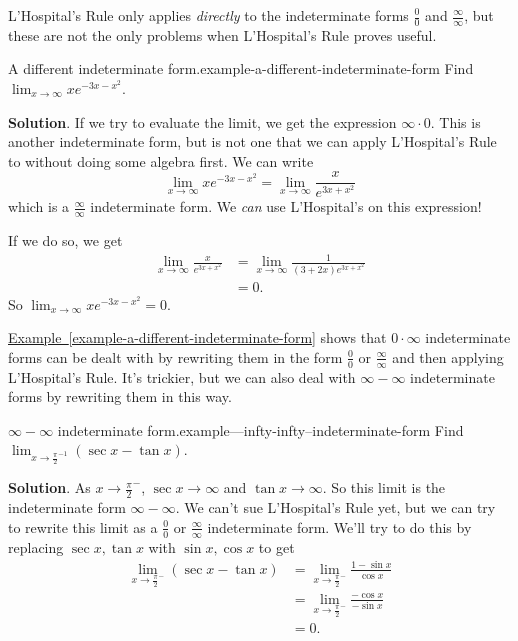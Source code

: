 \documentclass[10pt,]{book}
\numberwithin{equation}{section}
\begin{document}
\hypertarget{p-296}{}%
L'Hospital's Rule only applies \emph{directly} to the indeterminate forms \(\frac{0}{0}\) and \(\frac{\infty}{\infty}\), but these are not the only problems when L'Hospital's Rule proves useful.%
\begin{example}{A different indeterminate form.}{example-a-different-indeterminate-form}%
\hypertarget{p-297}{}%
Find \(\lim_{x\to\infty}xe^{-3x - x^{2}}\).%
\par\smallskip%
\noindent\textbf{Solution}.\hypertarget{solution-66}{}\quad%
\hypertarget{p-298}{}%
If we try to evaluate the limit, we get the expression \(\infty\cdot0\). This is another indeterminate form, but is not one that we can apply L'Hospital's Rule to without doing some algebra first. We can write%
\begin{equation*}
\lim_{x\to\infty}xe^{-3x-x^{2}} = \lim_{x\to\infty}\frac{x}{e^{3x+x^{2}}}
\end{equation*}
which is a \(\frac{\infty}{\infty}\) indeterminate form. We \emph{can} use L'Hospital's on this expression!%
\par
\hypertarget{p-299}{}%
If we do so, we get%
\begin{align*}
\lim_{x\to\infty}\frac{x}{e^{3x+x^{2}}} & = \lim_{x\to\infty}\frac{1}{(3+2x)e^{3x+x^{2}}} \\
& = 0. 
\end{align*}
So \(\lim_{x\to\infty}xe^{-3x-x^{2}} = 0\).%
\end{example}
\hypertarget{p-300}{}%
\hyperref[example-a-different-indeterminate-form]{Example~\ref{example-a-different-indeterminate-form}} shows that \(0\cdot\infty\) indeterminate forms can be dealt with by rewriting them in the form \(\frac{0}{0}\) or \(\frac{\infty}{\infty}\) and then applying L'Hospital's Rule. It's trickier, but we can also deal with \(\infty-\infty\) indeterminate forms by rewriting them in this way.%
\begin{example}{\(\infty-\infty\) indeterminate form.}{example---infty-infty--indeterminate-form}%
\hypertarget{p-301}{}%
Find \(\lim_{x\to\frac{\pi}{2}^{-1}}(\sec x-\tan x)\).%
\par\smallskip%
\noindent\textbf{Solution}.\hypertarget{solution-67}{}\quad%
\hypertarget{p-302}{}%
As \(x\to\frac{\pi}{2}^{-}\), \(\sec x\to\infty\) and \(\tan x\to\infty\). So this limit is the indeterminate form \(\infty-\infty\). We can't sue L'Hospital's Rule yet, but we can try to rewrite this limit as a \(\frac{0}{0}\) or \(\frac{\infty}{\infty}\) indeterminate form. We'll try to do this by replacing \(\sec x,\tan x\) with \(\sin x,\cos x\) to get%
\begin{align*}
\lim_{x\to\frac{\pi}{2}^{-}}(\sec x - \tan x) & =\lim_{x\to\frac{\pi}{2}^{-}}\frac{1-\sin x}{\cos x} \\
& = \lim_{x\to\frac{\pi}{2}^{-}}\frac{-\cos x}{-\sin x} \\
& = 0. 
\end{align*}
%
\end{example}
\end{document}
